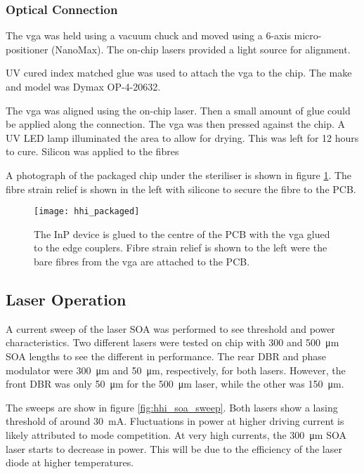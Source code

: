 \subsubsection*{Optical Connection}

The \ac{vga} was held using a vacuum chuck and moved using a 6-axis micro-positioner (NanoMax). The on-chip lasers provided a light source for alignment. 

UV cured index matched glue was used to attach the \ac{vga} to the chip. The make and model was Dymax OP-4-20632.

The \ac{vga} was aligned using the on-chip laser. Then a small amount of glue could be applied along the connection. The \ac{vga} was then pressed against the chip. A UV LED lamp illuminated the area to allow for drying. This was left for 12 hours to cure. Silicon was applied to the fibres 

A photograph of the packaged chip under the steriliser is shown in figure \ref{fig:hhi_photo}. The fibre strain relief is shown in the left with silicone to secure the fibre to the PCB. 

\begin{figure}
	\centering
	\texttt{[image: hhi\_packaged]}
	\caption[Photograph of packaged HHI transmitter]{The \ac{InP} device is glued to the centre of the PCB with the \ac{vga} glued to the edge couplers. Fibre strain relief is shown to the left were the bare fibres from the \ac{vga} are attached to the PCB.}
	\label{fig:hhi_photo}
\end{figure}

\subsection{Laser Operation}

A current sweep of the laser \ac{SOA} was performed to see threshold and power characteristics. Two different lasers were tested on chip with \num{300} and \SI{500}{\um} \ac{SOA} lengths to see the different in performance. The rear \ac{DBR} and phase modulator were \SI{300}{\um} and \SI{50}{\um}, respectively, for both lasers. However, the front \ac{DBR} was only \SI{50}{\um} for the \SI{500}{\um} laser, while the other was \SI{150}{\um}.

The sweeps are show in figure \ref{fig:hhi_soa_sweep}. Both lasers show a lasing threshold of around \SI{30}{\mA}. Fluctuations in power at higher driving current is likely attributed to mode competition. At very high currents, the \SI{300}{\um} \ac{SOA} laser starts to decrease in power. This will be due to the efficiency of the laser diode at higher temperatures.

